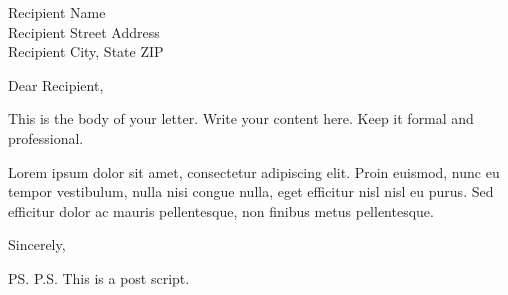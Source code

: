 \documentclass{letter}
\begin{document}
\begin{letter}{Recipient Name\\Recipient Street Address\\Recipient City, State ZIP}

\opening{Dear Recipient,}

This is the body of your letter. Write your content here. Keep it formal and professional.

Lorem ipsum dolor sit amet, consectetur adipiscing elit. Proin euismod, nunc eu tempor vestibulum, nulla nisi congue nulla, eget efficitur nisl nisl eu purus. Sed efficitur dolor ac mauris pellentesque, non finibus metus pellentesque.

\closing{Sincerely,}

\ps{P.S. This is a post script.}


\end{letter}
\end{document}
